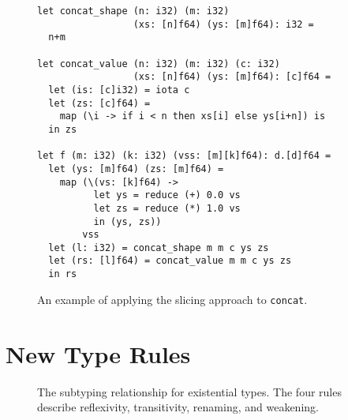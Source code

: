 \begin{figure}

\begin{lstlisting}[xleftmargin=0pt]
let concat_shape (n: i32) (m: i32)
                 (xs: [n]f64) (ys: [m]f64): i32 =
  n+m

let concat_value (n: i32) (m: i32) (c: i32)
                 (xs: [n]f64) (ys: [m]f64): [c]f64 =
  let (is: [c]i32) = iota c
  let (zs: [c]f64) =
    map (\i -> if i < n then xs[i] else ys[i+n]) is
  in zs

let f (m: i32) (k: i32) (vss: [m][k]f64): d.[d]f64 =
  let (ys: [m]f64) (zs: [m]f64) =
    map (\(vs: [k]f64) ->
          let ys = reduce (+) 0.0 vs
          let zs = reduce (*) 1.0 vs
          in (ys, zs))
        vss
  let (l: i32) = concat_shape m m c ys zs
  let (rs: [l]f64) = concat_value m m c ys zs
  in rs
\end{lstlisting}

  \caption{An example of applying the slicing approach to \lstinline{concat}.}
  \label{fig:FShapeSlice}
\end{figure}

\section{New Type Rules}
\label{sec:size-type-rules}

\begin{figure}





\caption{The subtyping relationship for existential types.  The four
  rules describe reflexivity, transitivity, renaming, and weakening.}
  \label{fig:ext-type-operations}
\end{figure}

